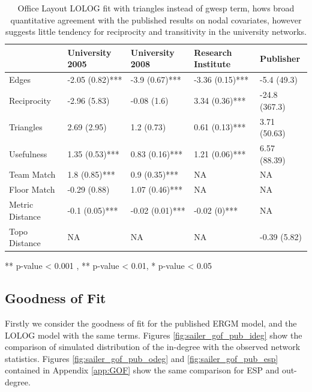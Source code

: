 \documentclass[
]{statsoc}
\begin{document}
\begin{table}

\caption{\label{tab:unnamed-chunk-5}\label{tab:sailer_lolog_tri} Office Layout LOLOG fit with triangles instead of gwesp term, hows broad quantitative agreement with the published results on nodal covariates, however suggests little tendency for reciprocity and transitivity in the university networks.}
\centering
\begin{threeparttable}
\begin{tabular}[t]{lllll}
\toprule
  & University 2005 & University 2008 & Research Institute & Publisher\\
\midrule
\rowcolor{gray!6}  Edges & -2.05 (0.82)*** & -3.9 (0.67)*** & -3.36 (0.15)*** & -5.4 (49.3)\\
Reciprocity & -2.96 (5.83) & -0.08 (1.6) & 3.34 (0.36)*** & -24.8 (367.3)\\
\rowcolor{gray!6}  Triangles & 2.69 (2.95) & 1.2 (0.73) & 0.61 (0.13)*** & 3.71 (50.63)\\
Usefulness & 1.35 (0.53)*** & 0.83 (0.16)*** & 1.21 (0.06)*** & 6.57 (88.39)\\
\rowcolor{gray!6}  Team Match & 1.8 (0.85)*** & 0.9 (0.35)*** & NA & NA\\
\addlinespace
Floor Match & -0.29 (0.88) & 1.07 (0.46)*** & NA & NA\\
\rowcolor{gray!6}  Metric Distance & -0.1 (0.05)*** & -0.02 (0.01)*** & -0.02 (0)*** & NA\\
Topo Distance & NA & NA & NA & -0.39 (5.82)\\
\bottomrule
\end{tabular}
\begin{tablenotes}
\item *** p-value < 0.001 , ** p-value < 0.01, * p-value < 0.05
\end{tablenotes}
\end{threeparttable}
\end{table}

\subsection{Goodness of Fit}

Firstly we consider the goodness of fit for the published ERGM model,
and the LOLOG model with the same terms. Figures
\ref{fig:sailer_gof_pub_ideg} show the comparison of simulated
distribution of the in-degree with the observed network statistics.
Figures \ref{fig:sailer_gof_pub_odeg} and \ref{fig:sailer_gof_pub_esp}
contained in Appendix \ref{app:GOF} show the same comparison for ESP and
out-degree.
\end{document}

